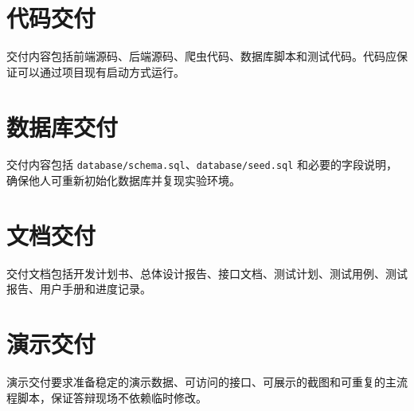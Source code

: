 \documentclass[UTF8,a4paper,12pt,fontset=none]{ctexrep}
\begin{document}
\section{代码交付}
交付内容包括前端源码、后端源码、爬虫代码、数据库脚本和测试代码。代码应保证可以通过项目现有启动方式运行。

\section{数据库交付}
交付内容包括 \texttt{database/schema.sql}、\texttt{database/seed.sql} 和必要的字段说明，确保他人可重新初始化数据库并复现实验环境。

\section{文档交付}
交付文档包括开发计划书、总体设计报告、接口文档、测试计划、测试用例、测试报告、用户手册和进度记录。

\section{演示交付}
演示交付要求准备稳定的演示数据、可访问的接口、可展示的截图和可重复的主流程脚本，保证答辩现场不依赖临时修改。
\end{document}
